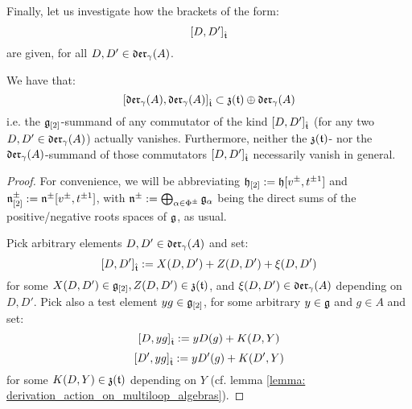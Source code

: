         Finally, let us investigate how the brackets of the form:
            $$[D, D']_{\hat{\mathfrak{t}}}$$
        are given, for all $D, D' \in \mathfrak{der}_{\gamma}(A)$.
        \begin{proposition} \label{prop: lie_bracket_on_orthogonal_complement_of_toroidal_centre}
            We have that:
                $$[ \mathfrak{der}_{\gamma}(A), \mathfrak{der}_{\gamma}(A) ]_{\hat{\mathfrak{t}}} \subset \mathfrak{z}(\mathfrak{t}) \oplus \mathfrak{der}_{\gamma}(A)$$
            i.e. the $\mathfrak{g}_{[2]}$-summand of any commutator of the kind $[D, D']_{\hat{\mathfrak{t}}}$ (for any two $D, D' \in \mathfrak{der}_{\gamma}(A)$) actually vanishes. Furthermore, neither the $\mathfrak{z}(\mathfrak{t})$- nor the $\mathfrak{der}_{\gamma}(A)$-summand of those commutators $[D, D']_{\hat{\mathfrak{t}}}$ necessarily vanish in general. 
        \end{proposition}
            \begin{proof}
                For convenience, we will be abbreviating $\mathfrak{h}_{[2]} := \mathfrak{h}[v^{\pm}, t^{\pm 1}]$ and $\mathfrak{n}^{\pm}_{[2]} := \mathfrak{n}^{\pm}[v^{\pm}, t^{\pm 1}]$, with $\mathfrak{n}^{\pm} := \bigoplus_{\alpha \in \Phi^{\pm}} \mathfrak{g}_{\alpha}$ being the direct sums of the positive/negative roots spaces of $\mathfrak{g}$, as usual.
            
                Pick arbitrary elements $D, D' \in \mathfrak{der}_{\gamma}(A)$ and set:
                    $$[D, D']_{\hat{\mathfrak{t}}} := X(D, D') + Z(D, D') + \xi(D, D')$$
                for some $X(D, D') \in \mathfrak{g}_{[2]}, Z(D, D') \in \mathfrak{z}(\mathfrak{t})$, and $\xi(D, D') \in \mathfrak{der}_{\gamma}(A)$ depending on $D, D'$. Pick also a test element $y g \in \mathfrak{g}_{[2]}$, for some arbitrary $y \in \mathfrak{g}$ and $g \in A$ and set:
                    $$[D, y g]_{\hat{\mathfrak{t}}} := y D( g ) + K(D, Y)$$
                    $$[D', y g]_{\hat{\mathfrak{t}}} := y D'( g ) + K(D', Y)$$
                for some $K(D, Y) \in \mathfrak{z}(\mathfrak{t})$ depending on $Y$ (cf. lemma \ref{lemma: derivation_action_on_multiloop_algebras}).
                

\end{proof}
